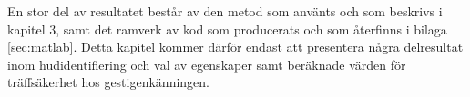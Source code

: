 \documentclass[../rapport_MVEX01-11-05]{subfiles}
\begin{document}
En stor del av resultatet består av den metod som använts och
som beskrivs i kapitel 3, samt
det ramverk av kod som producerats och som återfinns i bilaga 
\ref{sec:matlab}. Detta kapitel kommer därför endast att presentera
några delresultat inom hudidentifiering och val av egenskaper 
samt beräknade värden för
träffsäkerhet hos gestigenkänningen.
\end{document}
